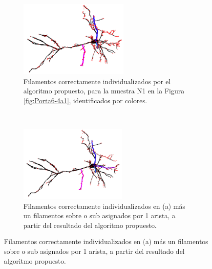 \begin{figure}[h!]
    \centering
    \begin{subfigure}[t]{0.49\textwidth}
        \centering
        \includegraphics[height=1.5in]{resultImages/Porta6-4a1-phil-s10-v05-exactMatch-antLabeled.png}
        \caption{Filamentos correctamente individualizados por el algoritmo propuesto, para la muestra N1 en la Figura \ref{fig:Porta6-4a1}, identificados por colores.}
        \label{fig:Porta6Propuesta}
    \end{subfigure}
    ~ 
    \begin{subfigure}[t]{0.49\textwidth}
        \centering
        \includegraphics[height=1.5in]{resultImages/Porta6-4a1-phil-s10-v056-overmatches-3-antLabeled.png}
        \caption{Filamentos correctamente individualizados en (a) m\'as un filamentos sobre o sub asignados por 1 arista, a partir del resultado del algoritmo propuesto.}
        \label{fig:Porta6Best}
    \end{subfigure}
    

\end{figure}
